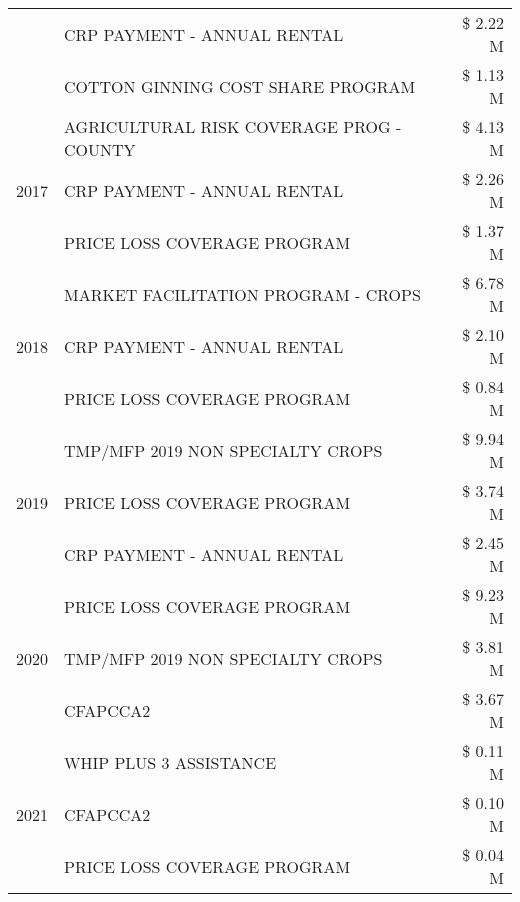 \begin{tabular}{llr}
 & CRP PAYMENT - ANNUAL RENTAL & \$ 2.22 M \\
 & COTTON GINNING COST SHARE PROGRAM & \$ 1.13 M \\
\cline{1-3}
\multirow[t]{3}{*}{2017} & AGRICULTURAL RISK COVERAGE PROG - COUNTY & \$ 4.13 M \\
 & CRP PAYMENT - ANNUAL RENTAL & \$ 2.26 M \\
 & PRICE LOSS COVERAGE PROGRAM & \$ 1.37 M \\
\cline{1-3}
\multirow[t]{3}{*}{2018} & MARKET FACILITATION PROGRAM - CROPS & \$ 6.78 M \\
 & CRP PAYMENT - ANNUAL RENTAL & \$ 2.10 M \\
 & PRICE LOSS COVERAGE PROGRAM & \$ 0.84 M \\
\cline{1-3}
\multirow[t]{3}{*}{2019} & TMP/MFP 2019 NON SPECIALTY CROPS & \$ 9.94 M \\
 & PRICE LOSS COVERAGE PROGRAM & \$ 3.74 M \\
 & CRP PAYMENT - ANNUAL RENTAL & \$ 2.45 M \\
\cline{1-3}
\multirow[t]{3}{*}{2020} & PRICE LOSS COVERAGE PROGRAM & \$ 9.23 M \\
 & TMP/MFP 2019 NON SPECIALTY CROPS & \$ 3.81 M \\
 & CFAPCCA2 & \$ 3.67 M \\
\cline{1-3}
\multirow[t]{3}{*}{2021} & WHIP PLUS 3 ASSISTANCE & \$ 0.11 M \\
 & CFAPCCA2 & \$ 0.10 M \\
 & PRICE LOSS COVERAGE PROGRAM & \$ 0.04 M \\
\cline{1-3}
\bottomrule
\end{tabular}
